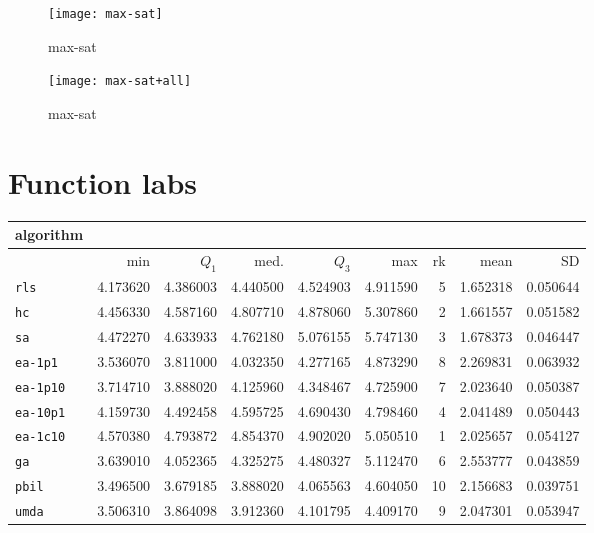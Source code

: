 \begin{center}
\begin{figure}[h]
\centering
\texttt{[image: max-sat]}
\caption{max-sat}
\end{figure}
\end{center}

\begin{center}
\begin{figure}[h]
\centering
\texttt{[image: max-sat+all]}
\caption{max-sat}
\end{figure}
\end{center}

\newpage

\section{Function labs}
\begin{center}
\begin{tabular}{@{}l*{5}{>{{}}N{1}{2}}>{{}}N{2}{0}N{1}{3}N{1}{3}@{}}
\toprule
{algorithm} &  &  \\
\midrule
& {min} & {$Q_1$} & {med.} & {$Q_3$} & {max} & {rk} & {mean} & {SD} \\
\midrule
\verb|rls| & 4.173620 & 4.386003 & 4.440500 & 4.524903 & 4.911590 & 5 & 1.652318 & 0.050644 \\
 \verb|hc| & 4.456330 & 4.587160 & 4.807710 & 4.878060 & 5.307860 & 2 & 1.661557 & 0.051582 \\
 \verb|sa| & 4.472270 & 4.633933 & 4.762180 & {\color{blue}} 5.076155 & {\color{blue}} 5.747130 & 3 & 1.678373 & 0.046447 \\
 \verb|ea-1p1| & 3.536070 & 3.811000 & 4.032350 & 4.277165 & 4.873290 & 8 & 2.269831 & 0.063932 \\
 \verb|ea-1p10| & 3.714710 & 3.888020 & 4.125960 & 4.348467 & 4.725900 & 7 & 2.023640 & 0.050387 \\
 \verb|ea-10p1| & 4.159730 & 4.492458 & 4.595725 & 4.690430 & 4.798460 & 4 & 2.041489 & 0.050443 \\
 \verb|ea-1c10| & {\color{blue}} 4.570380 & {\color{blue}} 4.793872 & {\color{blue}} 4.854370 & 4.902020 & 5.050510 & 1 & 2.025657 & 0.054127 \\
 \verb|ga| & 3.639010 & 4.052365 & 4.325275 & 4.480327 & 5.112470 & 6 & 2.553777 & 0.043859 \\
 \verb|pbil| & 3.496500 & 3.679185 & 3.888020 & 4.065563 & 4.604050 & 10 & 2.156683 & 0.039751 \\
 \verb|umda| & 3.506310 & 3.864098 & 3.912360 & 4.101795 & 4.409170 & 9 & 2.047301 & 0.053947 \\
 \bottomrule
\end{tabular}
\end{center}

